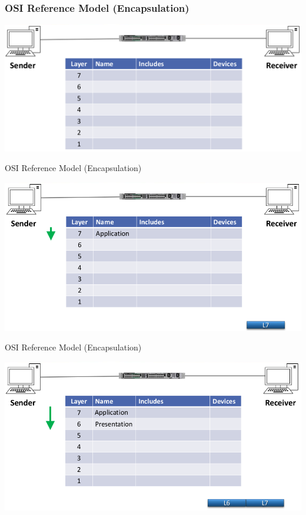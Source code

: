\documentclass[pdflatex,compress,mathserif]{beamer}
\begin{document}
\begin{frame}
	\frametitle{OSI Reference Model (Encapsulation)}
	\begin{center}
		\includegraphics[width=\linewidth]{img/img01}
	\end{center}
\end{frame}

\begin{frame}{OSI Reference Model (Encapsulation)}
	\begin{center}
		\includegraphics[width=\linewidth]{img/img02}
	\end{center}
\end{frame}

\begin{frame}{OSI Reference Model (Encapsulation)}
	\begin{center}
		\includegraphics[width=\linewidth]{img/img03}
	\end{center}
\end{frame}
\end{document}
